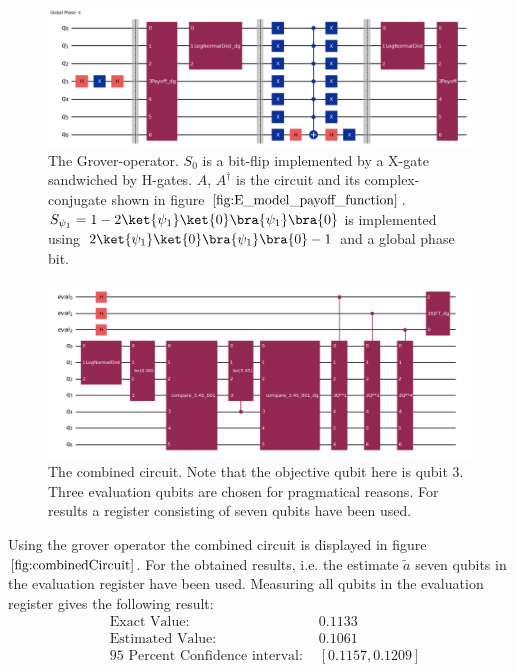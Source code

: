 \documentclass[../main.tex]{subfiles}
\begin{document}
 \begin{figure}[H]
  \begin{center}
    \includegraphics[width=\linewidth]{../../images/grover.png}
  \end{center}
  \caption{The Grover-operator. $S_0$ is a bit-flip implemented by a X-gate sandwiched by H-gates. $A$, $A^{\dagger}$ is the circuit and its complex-conjugate shown in figure $\ref{fig:E_model_payoff_function}$.\\
  $S_{\psi_1} = 1-2\ket{\psi_1}\ket{0}\bra{\psi_1}\bra{0}$ is implemented using $2\ket{\psi_1}\ket{0}\bra{\psi_1}\bra{0}-1$ and a global phase bit.}
  \label{fig:grover}
\end{figure}
 \begin{figure}[H]
  \begin{center}
    \includegraphics[width=\linewidth]{../../images/combinedCircuit.png}
  \end{center}
  \caption{The combined circuit. Note that the objective qubit here is qubit 3. 
  Three evaluation qubits are chosen for pragmatical reasons. For results a register consisting of seven qubits have been used.}
  \label{fig:combinedCircuit}
\end{figure}
Using the grover operator the combined circuit is displayed in figure $\ref{fig:combinedCircuit}$. 
For the obtained results, i.e. the estimate $\tilde{a}$ seven qubits in the evaluation register have been used. 
Measuring all qubits in the evaluation register gives the following result:
\begin{align}
    &\text{Exact Value: } &0.1133\\
    &\text{Estimated Value: } &0.1061\\
    &\text{95 Percent Confidence interval:	} &[0.1157, 0.1209]
\end{align}
\end{document}
